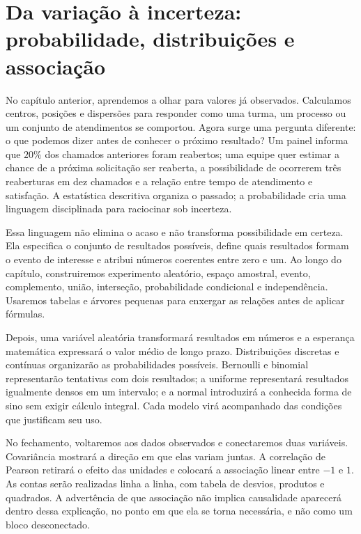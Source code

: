 \chapter[Da variação à incerteza]{Da variação à incerteza: probabilidade, distribuições e associação}

No capítulo anterior, aprendemos a olhar para valores já observados. Calculamos centros, posições e dispersões para responder como uma turma, um processo ou um conjunto de atendimentos se comportou. Agora surge uma pergunta diferente: o que podemos dizer antes de conhecer o próximo resultado? Um painel informa que $20\%$ dos chamados anteriores foram reabertos; uma equipe quer estimar a chance de a próxima solicitação ser reaberta, a possibilidade de ocorrerem três reaberturas em dez chamados e a relação entre tempo de atendimento e satisfação. A estatística descritiva organiza o passado; a probabilidade cria uma linguagem disciplinada para raciocinar sob incerteza.

Essa linguagem não elimina o acaso e não transforma possibilidade em certeza. Ela especifica o conjunto de resultados possíveis, define quais resultados formam o evento de interesse e atribui números coerentes entre zero e um. Ao longo do capítulo, construiremos experimento aleatório, espaço amostral, evento, complemento, união, interseção, probabilidade condicional e independência. Usaremos tabelas e árvores pequenas para enxergar as relações antes de aplicar fórmulas.

Depois, uma variável aleatória transformará resultados em números e a esperança matemática expressará o valor médio de longo prazo. Distribuições discretas e contínuas organizarão as probabilidades possíveis. Bernoulli e binomial representarão tentativas com dois resultados; a uniforme representará resultados igualmente densos em um intervalo; e a normal introduzirá a conhecida forma de sino sem exigir cálculo integral. Cada modelo virá acompanhado das condições que justificam seu uso.

No fechamento, voltaremos aos dados observados e conectaremos duas variáveis. Covariância mostrará a direção em que elas variam juntas. A correlação de Pearson retirará o efeito das unidades e colocará a associação linear entre $-1$ e $1$. As contas serão realizadas linha a linha, com tabela de desvios, produtos e quadrados. A advertência de que associação não implica causalidade aparecerá dentro dessa explicação, no ponto em que ela se torna necessária, e não como um bloco desconectado.

